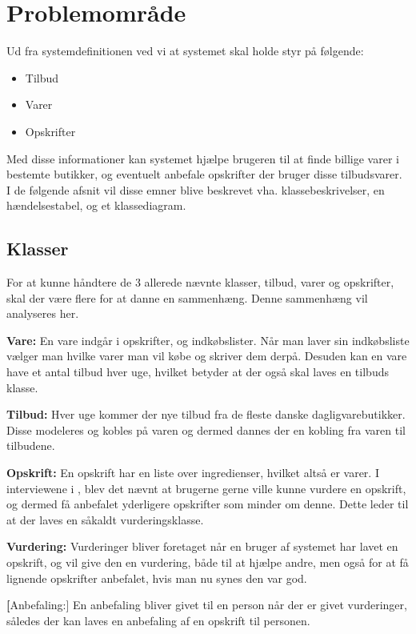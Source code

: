 \section{Problemområde}

Ud fra systemdefinitionen ved vi at systemet skal holde styr på følgende:

\begin{itemize}
	\item Tilbud
	\item Varer
	\item Opskrifter
\end{itemize}

Med disse informationer kan systemet hjælpe brugeren til at finde billige varer i bestemte butikker, og eventuelt anbefale opskrifter der bruger disse tilbudsvarer.
I de følgende afsnit vil disse emner blive beskrevet vha. klassebeskrivelser, en hændelsestabel, og et klassediagram.

\subsection{Klasser}
For at kunne håndtere de 3 allerede nævnte klasser, tilbud, varer og opskrifter, skal der være flere for at danne en sammenhæng.
Denne sammenhæng vil analyseres her.

\textbf{Vare:}
En vare indgår i opskrifter, og indkøbslister.
Når man laver sin indkøbsliste vælger man hvilke varer man vil købe og skriver dem derpå. 
Desuden kan en vare have et antal tilbud hver uge, hvilket betyder at der også skal laves en tilbuds klasse.

\textbf{Tilbud:}
Hver uge kommer der nye tilbud fra de fleste danske dagligvarebutikker. 
Disse modeleres og kobles på varen og dermed dannes der en kobling fra varen til tilbudene.

\textbf{Opskrift:}
En opskrift har en liste over ingredienser, hvilket altså er varer.
I interviewene i , blev det nævnt at brugerne gerne ville kunne vurdere en opskrift, og dermed få anbefalet yderligere opskrifter som minder om denne.
Dette leder til at der laves en såkaldt vurderingsklasse.

\textbf{Vurdering:}
Vurderinger bliver foretaget når en bruger af systemet har lavet en opskrift, og vil give den en vurdering, både til at hjælpe andre, men også for at få lignende opskrifter anbefalet, hvis man nu synes den var god.

\textbf[Anbefaling:]
En anbefaling bliver givet til en person når der er givet vurderinger, således der kan laves en anbefaling af en opskrift til personen.

